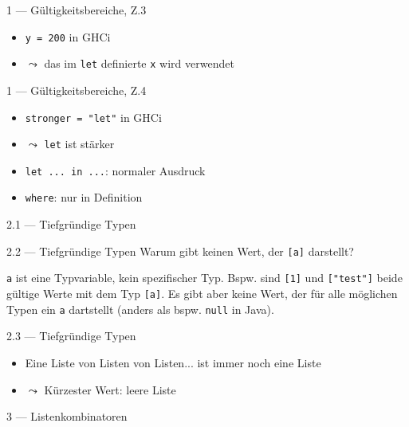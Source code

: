 \documentclass{beamer}
\newenvironment{qaa}[1]{
	#1

	\begin{mdframed}
		\small
}{
	\end{mdframed}
}
\newcommand{\code}[1]{
	\begin{mdframed}
		
	\end{mdframed}
}
\begin{document}
\begin{frame}{1 --- Gültigkeitsbereiche, Z.3}
	\code{demos/LetX.hs}
	\pause
	\begin{itemize}
		\item \texttt{y = 200} in GHCi
		\item $\leadsto$ das im \texttt{let} definierte \texttt{x} wird verwendet
	\end{itemize}
\end{frame}

\begin{frame}{1 --- Gültigkeitsbereiche, Z.4}
	\code{demos/LetVsWhere.hs}
	\pause
	\begin{itemize}
		\item \texttt{stronger = "let"} in GHCi
		\item $\leadsto$ \texttt{let} ist stärker
		\item \texttt{let ... in ...}: normaler Ausdruck
		\item \texttt{where}: nur in Definition
	\end{itemize}
\end{frame}

\begin{frame}{2.1 --- Tiefgründige Typen}
	\code{demos/DeepTypes.hs}
\end{frame}

\begin{frame}{2.2 --- Tiefgründige Typen}
	\begin{qaa}{Warum gibt keinen Wert, der \texttt{[a]} darstellt?}
		\texttt{a} ist eine Typvariable, kein spezifischer Typ.
		Bspw. sind \texttt{[1]} und \texttt{["test"]} beide gültige Werte mit dem Typ \texttt{[a]}.
		Es gibt aber keine Wert, der für alle möglichen Typen ein \texttt{a} dartstellt (anders als bspw. \texttt{null} in Java).
	\end{qaa}
\end{frame}

\begin{frame}{2.3 --- Tiefgründige Typen}
	\code{demos/NestedList.hs}

  \begin{itemize}
    \item Eine Liste von Listen von Listen... ist immer noch eine Liste
    \item $\leadsto$ Kürzester Wert: leere Liste
  \end{itemize}
\end{frame}

\begin{frame}{3 --- Listenkombinatoren}
  \code{demos/Polynom.hs}
\end{frame}
\end{document}

